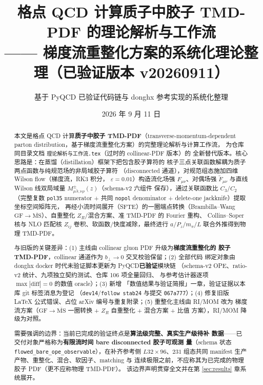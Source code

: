\documentclass[11pt,a4paper]{ctexart}
\title{\textbf{格点 QCD 计算质子中胶子 TMD-PDF 的理论解析与工作流}\\[0.4em]
\large —— 梯度流重整化方案的系统化理论整理（已验证版本 v20260911）}
\author{基于 PyQCD 已验证代码链与 donghx 参考实现的系统化整理}
\date{2026 年 9 月 11 日}
\newcommand{\eps}{\varepsilon}
\newcommand{\MSbarM}{\overline{\text{MS}}}
\newcommand{\code}[1]{\texttt{#1}}
\newcommand{\GFr}{\mathrm{GF}}
\newcommand{\bperp}{b_{\perp}}
\begin{document}
\maketitle

\begin{abstract}
\noindent
本文是格点 QCD 计算\textbf{质子中胶子 TMD-PDF}（transverse-momentum-dependent
parton distribution，基于梯度流重整化方案）的完整理论解析与计算工作流，
为仓库同目录文档 \code{理论解析与工作流.tex}（过时的 collinear-PDF 版本）的
全新替代版本。核心思路是：在蒸馏（distillation）框架下把包含胶子算符的
核子三点关联函数解耦为质子两点函数与纯规范场的非局域胶子算符
（disconnected 通道），对规范组态施加四维 Wilson flow（梯度流，RK3 积分，
$\eps=0.01$）构造流化场强 $F_{\mu\nu}$、对偶场强 $\widetilde F_{\mu\nu}$
与直线 Wilson 线双局域量 $M_{\mu\lambda;\nu\rho}^{\pm}(z)$（schema-v2 六组件
保存），通过关联函数比 $C_3/C_2$（完整复数 \code{pol35} numerator +
共同 \code{nopol} denominator + delete-one jackknife）提取坐标空间矩阵元，
再经小流时间展开（SFTE）的一圈端点转换（Brambilla--Wang
$\GFr\to\MSbarM$）、自重整化 $Z_R$/混合方案、准 TMD-PDF 的 Fourier 重构、
Collins--Soper 核与 NLO 匹配核 $Z_{ij}$ 卷积、软函数/快度减除，最终进行
$a/P_z/m_\pi/L$ 联合外推得到物理 TMD-PDF。

与旧版的关键差异：(1) 主线由 collinear gluon PDF 升级为\textbf{梯度流重整化的
胶子 TMD-PDF}，collinear 通道作为 $\bperp\to 0$ 交叉校验保留；(2) 全部代码
绑定对象由 donghx docker 时代未验证脚本更新为 PyQCD\textbf{已验证}模块链
（schema-v2 OPE、ratio-v2 统计、九项独立契约测试、仓库 106 项全量回归、
与参考估计器逐项 $\max|\mathrm{diff}|=0$ 的数值 oracle）；(3) 新增
「数值结果与验证简报」一章，验证证据以本库 git 标签消息为登记
（\code{dev14}/\code{follow stab24} 与提交 \code{067a777}）；(4) 修复旧版
LaTeX 公式错误、占位 arXiv 编号与重复附录；(5) 重整化主线由 RI/MOM 改为
梯度流方案（$\GFr\to\MSbarM$ 一圈转换 + $Z_R$ 自重整化 + 混合方案 + 比值
方案），RI/MOM 降级为对照。

需要强调的边界：当前已完成的验证终点是\textbf{算法级完整、真实生产级待补
数据}——已交付对象严格称为\textbf{有限流时间 bare disconnected 胶子可观测
量}（schema 状态 \code{flowed\_bare\_ope\_observable}），在补齐参考侧
$L32\times96$、$231$ 组态共同 manifest 生产产物、重整化、混合、软因子、matching 与
连续极限之前，不应称其为已完成的物理胶子 PDF（更不应称物理 TMD-PDF）。
该边界声明贯穿全文并在第 \ref{sec:results} 章系统展开。
\end{abstract}

\tableofcontents
\newpage

\end{document}
